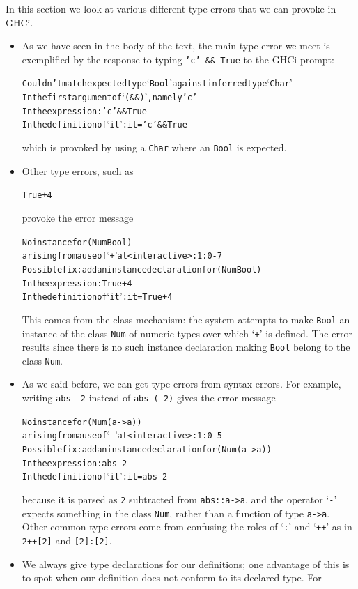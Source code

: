 In this section we look at various different type errors that we can provoke in GHCi.

\begin{itemize}
\item  
As we have seen in the body of the text, the main type error we meet is
exemplified by the response to typing \texttt{'c' \&\& True} to the GHCi prompt:
\begin{alltt}
Couldn't match expected type `Bool' against inferred type `Char'
In the first argument of `(\&\&)', namely 'c'
In the expression: 'c' \&\& True
In the definition of `it': it = 'c' \&\& True
\end{alltt}
which is provoked by using a \texttt{Char} where an \texttt{Bool} is expected. 
\item
Other type errors, such as
\begin{alltt}
True + 4        
\end{alltt}
provoke the error message
\begin{alltt}
No instance for (Num Bool)
  arising from a use of `+' at <interactive>:1:0-7
Possible fix: add an instance declaration for (Num Bool)
In the expression: True + 4
In the definition of `it': it = True + 4
\end{alltt}
This comes from the class mechanism: the system attempts to make \texttt{Bool}
an instance of the class \texttt{Num} of numeric types over which `\texttt{+}' is
defined. The error results since there is no such instance
declaration making \texttt{Bool} belong to the class \texttt{Num}.
\item 
As we said before,
we can get type errors from syntax errors. For example, writing \texttt{abs -2}
instead of \texttt{abs (-2)} gives the error message
\begin{alltt}
No instance for (Num (a -> a))
  arising from a use of `-' at <interactive>:1:0-5
Possible fix: add an instance declaration for (Num (a -> a))
In the expression: abs - 2
In the definition of `it': it = abs - 2
\end{alltt}
because it is parsed as \texttt{2} subtracted from \texttt{abs::a->a}, and
the operator `\texttt{-}' expects something in the class \texttt{Num}, 
rather than a function of type
\texttt{a->a}. Other common type errors come from confusing the roles of `\texttt{:}'
and `\texttt{++}' as in \texttt{2++[2]} and \texttt{[2]:[2]}.
\item
We always give type declarations for our definitions; one advantage of this is
to spot when our definition does not conform to its declared type. For

\end{itemize}
